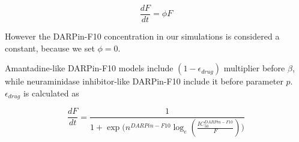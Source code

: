 \begin{equation}
\frac{dF}{dt} = \phi F
\end{equation}

However the DARPin-F10 concentration in our simulations is considered a constant, because we set $\phi = 0$.

Amantadine-like DARPin-F10 models include $(1-\epsilon_{drug})$ multiplier before $\beta$, while neuraminidase inhibitor-like DARPin-F10 include it before parameter $p$. $\epsilon_{drug}$ is calculated as

\begin{equation}
\frac{dF}{dt} = \frac{1}{1 + \exp\big(n^{DARPin-F10} \log_e (\frac{IC_{50}^{DARPin-F10}}{F})\big)}
\end{equation}